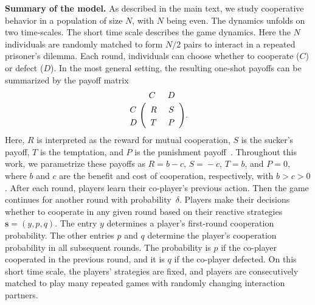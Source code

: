 \documentclass[11pt]{article}
\theoremstyle{plainCl1}
\theoremstyle{plainCl2}
\begin{document}
\noindent
{\bf Summary of the model.} As described in the main text, we study cooperative behavior in a population of size $N$, with $N$ being even.
The dynamics unfolds on two time-scales. 
The short time scale describes the game dynamics. 
Here the $N$ individuals are randomly matched to form $N/2$ pairs to interact in a repeated prisoner's dilemma.  
Each round, individuals can choose whether to cooperate ($C$) or defect ($D$). 
In the most general setting, the resulting one-shot payoffs can be summarized by the payoff matrix 
\begin{align}
	\bordermatrix{%
		& C & D \cr
		C &\ R &\ S\  \cr
		D &\ T &\ P\ \cr
	} . \label{eq:prisoner}
\end{align}
Here, $R$ is interpreted as the reward for mutual cooperation, $S$ is the sucker's payoff, $T$ is the temptation, and $P$ is the punishment payoff~\citep{axelrod1981evolution}. 
Throughout this work, we parametrize these payoffs as $R\!=\!b\!-\!c$, $S\!=\!-c$, $T\!=\!b$, and $P\!=\!0$, where $b$ and $c$ are the benefit and cost of cooperation, respectively, with $b\!>\!c\!>0$. 
After each round, players learn their co-player's previous action. 
Then the game continues for another round with probability~$\delta$.
Players make their decisions whether to cooperate in any given round based on their reactive strategies $\mathbf{s}\!=\!(y,p,q)$. 
The entry $y$ determines a player's first-round cooperation probability. 
The other entries $p$ and $q$ determine the player's cooperation probability in all subsequent rounds. 
The probability is $p$ if the co-player cooperated in the previous round, and it is $q$ if the co-player defected. 
On this short time scale, the players' strategies are fixed, and players are consecutively matched to play many repeated games with randomly changing interaction partners. 

\end{document}
